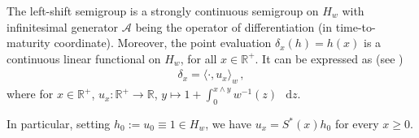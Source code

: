 \documentclass[10pt,a4paper,reqno]{amsart}
\newcommand*\D{\mathop{}\!\mathrm{d}}
\numberwithin{equation}{section}
\theoremstyle{plain}
\theoremstyle{definition}
\theoremstyle{example}
\renewcommand{\MR}{\mathbb{R}}
\newcommand{\R}{\MR}
\newcommand{\cA}{\mathcal{A}}
\newcommand{\norm}[1]{\|#1\|}
\newcommand{\MRplus}{\MR^{+}}
\begin{document}
The left-shift semigroup is a strongly continuous semigroup on $H_w$ with infinitesimal generator $\cA$ being the operator of differentiation (in time-to-maturity coordinate). 
Moreover, the point evaluation $\delta_x(h) = h(x)$ is a continuous linear functional on $H_{w}$, for all $x \in \R^+$. 
It can be expressed as (see \cite[Lemma 5.3.1]{Fil01})
 \begin{align}\label{eq:insert-element}
 \delta_{x}=\langle \cdot, u_{x}\rangle_{w}\,,  
 \end{align}
 where for $x \in \R^+$, $u_x: \R^+ \rightarrow \R$, $y \mapsto 1+\int_{0}^{x\wedge y}w^{-1}(z)\,\D z$.\par
In particular, setting $h_0:=u_0\equiv 1\in H_w$, we have $u_x=S^*(x)h_0$ for every $x\ge0$.
\end{document}
